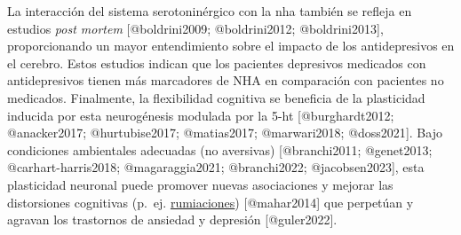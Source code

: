 \documentclass[
  11pt]{../MastersDoctoralThesisUNAM}
\begin{document}
La interacción del sistema serotoninérgico con la \ac{nha} también se
refleja en estudios \emph{post mortem} {[}@boldrini2009; @boldrini2012;
@boldrini2013{]}, proporcionando un mayor entendimiento sobre el impacto
de los antidepresivos en el cerebro. Estos estudios indican que los
pacientes depresivos medicados con antidepresivos tienen más marcadores
de NHA en comparación con pacientes no medicados. Finalmente, la
flexibilidad cognitiva se beneficia de la plasticidad inducida por esta
neurogénesis modulada por la \ac{5-ht} {[}@burghardt2012; @anacker2017;
@hurtubise2017; @matias2017; @marwari2018; @doss2021{]}. Bajo
condiciones ambientales adecuadas (no aversivas) {[}@branchi2011;
@genet2013; @carhart-harris2018; @magaraggia2021; @branchi2022;
@jacobsen2023{]}, esta plasticidad neuronal puede promover nuevas
asociaciones y mejorar las distorsiones cognitivas (p.~ej.
\href{AppendixB.qmd\#term-id-70}{rumiaciones}) {[}@mahar2014{]} que
perpetúan y agravan los trastornos de ansiedad y depresión
{[}@guler2022{]}.
\end{document}

